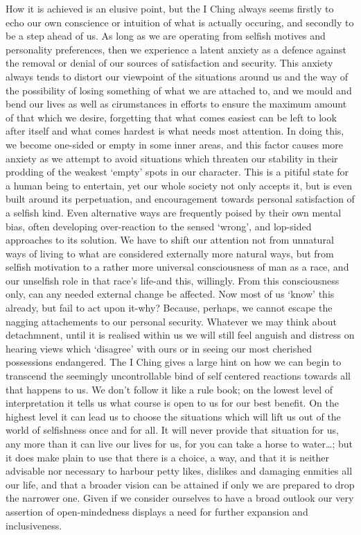 \documentclass[11pt]{book}
\begin{document}
How it is achieved is an elusive point, but the I Ching always seems firstly to echo our own conscience or intuition of what is actually occuring, and secondly to be a step ahead of us. As long as we are operating from selfish motives and personality preferences, then we experience a latent anxiety as a defence against the removal or denial of our sources of satisfaction and security. This anxiety always tends to distort our viewpoint of the situations around us and the way of the possibility of losing something of what we are attached to, and we mould and bend our lives as well as cirumstances in efforts to ensure the maximum amount of that which we desire, forgetting that what comes easiest can be left to look after itself and what comes hardest is what needs most attention. In doing this, we become one-sided or empty in some inner areas, and this factor causes more anxiety as we attempt to avoid situations which threaten our stability in their prodding of the weakest `empty' spots in our character. This is a pitiful state for a human being to entertain, yet our whole society not only accepts it, but is even built around its perpetuation, and encouragement towards personal satisfaction of a selfish kind. Even alternative ways are frequently poised by their own mental bias, often developing over-reaction to the sensed `wrong', and lop-sided approaches to its solution. We have to shift our attention not from unnatural ways of living to what are considered externally more natural ways, but from selfish motivation to a rather more universal consciousness of man as a race, and our unselfish role in that race's life-and this, willingly. From this consciousness only, can any needed external change be affected. Now most of us `know' this already, but fail to act upon it-why? Because, perhaps, we cannot escape the nagging attachements to our personal security. Whatever we may think about detachmnent, until it is realised within us we will still feel anguish and distress on hearing views which `disagree' with ours or in seeing our most cherished possessions endangered. The I Ching gives a large hint on how we can begin to transcend the seemingly uncontrollable bind of self centered reactions towards all that happens to us. We don't follow it like a rule book; on the lowest level of interpretation it tells us what course is open to us for our best benefit. On the highest level it can lead us to choose the situations which will lift us out of the world of selfishness once and for all. It will never provide that situation for us, any more than it can live our lives for us, for you can take a horse to water\ldots; but it does make plain to use that there is a choice, a way, and that it is neither advisable nor necessary to harbour petty likes, dislikes and damaging enmities all our life, and that a broader vision can be attained if only we are prepared to drop the narrower one. Given if we consider ourselves to have a broad outlook our very assertion of open-mindedness displays a need for further expansion and inclusiveness.
\end{document}
